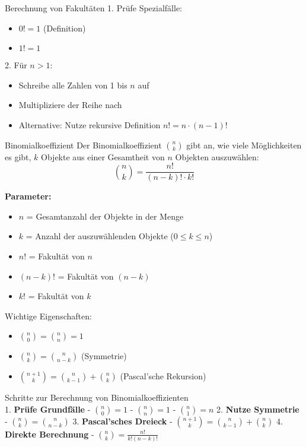 \begin{KR}{Berechnung von Fakultäten}
1. Prüfe Spezialfälle:
   \begin{itemize}
   \item $0! = 1$ (Definition)
   \item $1! = 1$
   \end{itemize}
2. Für $n > 1$:
   \begin{itemize}
   \item Schreibe alle Zahlen von 1 bis $n$ auf
   \item Multipliziere der Reihe nach
   \item Alternative: Nutze rekursive Definition $n! = n \cdot (n-1)!$
   \end{itemize}
\end{KR}

\begin{definition}{Binomialkoeffizient}
Der Binomialkoeffizient $\binom{n}{k}$ gibt an, wie viele Möglichkeiten es gibt, $k$ Objekte aus einer Gesamtheit von $n$ Objekten auszuwählen:
$$
\binom{n}{k}=\frac{n!}{(n-k)!\cdot k!}
$$

\textbf{Parameter:}
\begin{itemize}
    \item $n$ = Gesamtanzahl der Objekte in der Menge
    \item $k$ = Anzahl der auszuwählenden Objekte ($0 \leq k \leq n$)
    \item $n!$ = Fakultät von $n$
    \item $(n-k)!$ = Fakultät von $(n-k)$
    \item $k!$ = Fakultät von $k$
\end{itemize}
\end{definition}

\begin{theorem}{Wichtige Eigenschaften:}
\begin{itemize}
    \item $\binom{n}{0} = \binom{n}{n} = 1$
    \item $\binom{n}{k} = \binom{n}{n-k}$ (Symmetrie)
    \item $\binom{n+1}{k} = \binom{n}{k-1} + \binom{n}{k}$ (Pascal'sche Rekursion)
\end{itemize}
\end{theorem}

\begin{KR}{Schritte zur Berechnung von Binomialkoeffizienten}\\
1. \textbf{Prüfe Grundfälle}
   - $\binom{n}{0} = 1$
   - $\binom{n}{n} = 1$
   - $\binom{n}{1} = n$
2. \textbf{Nutze Symmetrie}
   - $\binom{n}{k} = \binom{n}{n-k}$
3. \textbf{Pascal'sches Dreieck}
   - $\binom{n+1}{k} = \binom{n}{k-1} + \binom{n}{k}$
4. \textbf{Direkte Berechnung}
   - $\binom{n}{k} = \frac{n!}{k!(n-k)!}$
\end{KR}















